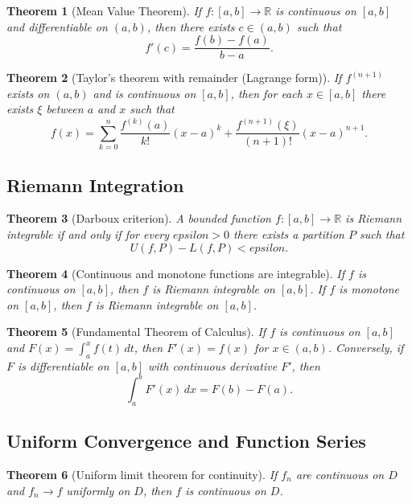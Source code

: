 \documentclass[12pt]{article}
\numberwithin{equation}{section}
\def\eps{epsilon}
\def\diff{d}
\newcommand{\RR}{\mathbb{R}}
\newcommand{\eps}{\varepsilon}               %
\newcommand{\diff}{\mathop{}\!\mathrm{d}}    %
\theoremstyle{plain}
\newtheorem{theorem}{Theorem}[section]
\theoremstyle{definition}
\theoremstyle{remark}
\begin{document}
\begin{theorem}[Mean Value Theorem]
If $f:[a,b]\to\RR$ is continuous on $[a,b]$ and differentiable on $(a,b)$,
then there exists $c\in(a,b)$ such that
\[
f'(c)=\frac{f(b)-f(a)}{b-a}.
\]
\end{theorem}

\begin{theorem}[Taylor's theorem with remainder (Lagrange form)]
If $f^{(n+1)}$ exists on $(a,b)$ and is continuous on $[a,b]$, then for each $x\in[a,b]$ there exists $\xi$ between $a$ and $x$ such that
\[
f(x)=\sum_{k=0}^{n}\frac{f^{(k)}(a)}{k!}(x-a)^k
+\frac{f^{(n+1)}(\xi)}{(n+1)!}(x-a)^{n+1}.
\]
\end{theorem}

\subsection{Riemann Integration}

\begin{theorem}[Darboux criterion]
A bounded function $f:[a,b]\to\RR$ is Riemann integrable if and only if
for every $\eps>0$ there exists a partition $P$ such that
\[
U(f,P)-L(f,P)<\eps.
\]
\end{theorem}

\begin{theorem}[Continuous and monotone functions are integrable]
If $f$ is continuous on $[a,b]$, then $f$ is Riemann integrable on $[a,b]$.
If $f$ is monotone on $[a,b]$, then $f$ is Riemann integrable on $[a,b]$.
\end{theorem}

\begin{theorem}[Fundamental Theorem of Calculus]
If $f$ is continuous on $[a,b]$ and $F(x)=\int_a^x f(t)\,\diff t$, then $F'(x)=f(x)$ for $x\in(a,b)$.
Conversely, if $F$ is differentiable on $[a,b]$ with continuous derivative $F'$, then
\[
\int_a^b F'(x)\,\diff x = F(b)-F(a).
\]
\end{theorem}

\subsection{Uniform Convergence and Function Series}

\begin{theorem}[Uniform limit theorem for continuity]
If $f_n$ are continuous on $D$ and $f_n\to f$ uniformly on $D$, then $f$ is continuous on $D$.
\end{theorem}
\end{document}
